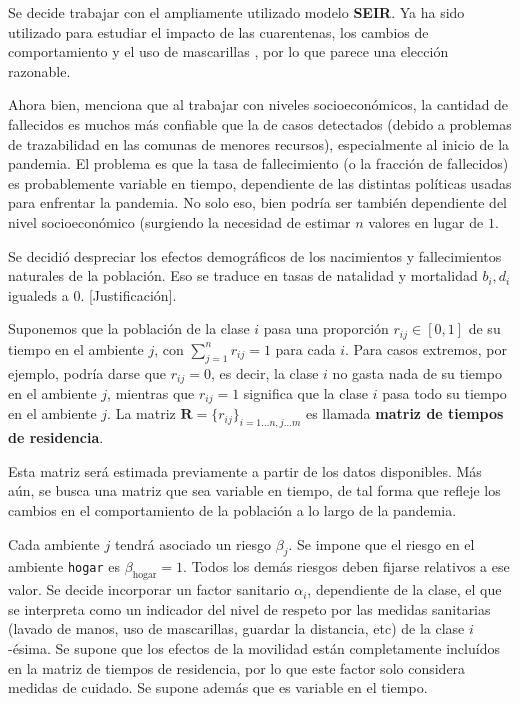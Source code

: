 Se decide trabajar con el ampliamente utilizado \cite{} modelo \textbf{SEIR}. Ya ha sido utilizado para estudiar el impacto de las cuarentenas, los cambios de comportamiento y el uso de mascarillas \cite{}, por lo que parece una elección razonable. 

Ahora bien, \cite{Mena2021} menciona que al trabajar con niveles socioeconómicos, la cantidad de fallecidos es muchos más confiable que la de casos detectados (debido a problemas de trazabilidad en las comunas de menores recursos), especialmente al inicio de la pandemia. El problema es que la tasa de fallecimiento (o la fracción de fallecidos) es probablemente variable en tiempo, dependiente de las distintas políticas usadas para enfrentar la pandemia. No solo eso, bien podría ser también dependiente del nivel socioeconómico \cite{} (surgiendo la necesidad de estimar \(n\) valores en lugar de \(1\). 



Se decidió despreciar los efectos demográficos de los nacimientos y fallecimientos naturales de la población. Eso se traduce en tasas de natalidad y mortalidad \(b_i, d_i\) igualeds a 0. [Justificación]. 

Suponemos que la población de la clase \(i\) pasa una proporción \(r_{ij} \in [0,1]\) de su tiempo en el ambiente \(j\), con \(\sum_{j = 1}^{n} r_{ij} = 1\) para cada \(i\). Para casos extremos, por ejemplo, podría darse que \(r_{ij} = 0\), es decir, la clase \(i\) no gasta nada de su tiempo en el ambiente \(j\), mientras que \(r_{ij} = 1\) significa que la clase \(i\) pasa todo su tiempo en el ambiente \(j\). La matriz \(\mathbf{R} = \{r_{ij}\}_{i = 1\dots n,j \dots m}\) es llamada \textbf{matriz de tiempos de residencia}.

Esta matriz será estimada previamente a partir de los datos disponibles. Más aún, se busca una matriz que sea variable en tiempo, de tal forma que refleje los cambios en el comportamiento de la población a lo largo de la pandemia.

Cada ambiente \(j\) tendrá asociado un riesgo \(\beta_j\). Se impone que el riesgo en el ambiente \texttt{hogar} es \(\beta_{\text{hogar}} = 1\). Todos los demás riesgos deben fijarse relativos a ese valor. Se decide incorporar un factor sanitario \(\alpha_i\), dependiente de la clase, el que se interpreta como un indicador del nivel de respeto por las medidas sanitarias (lavado de manos, uso de mascarillas, guardar la distancia, etc) de la clase \(i\)-ésima. Se supone que los efectos de la movilidad están completamente incluídos en la matriz de tiempos de residencia, por lo que este factor solo considera medidas de cuidado. Se supone además que es variable en el tiempo. 

